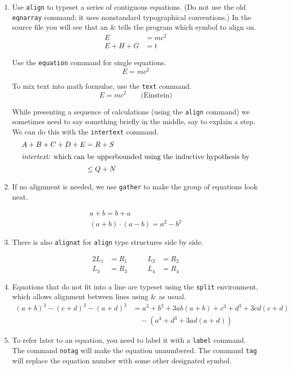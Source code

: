 \begin{enumerate}
\item Use {\tt align} to typeset a series of contiguous equations.
(Do not use the old {\tt eqnarray} command; it uses nonstandard 
typographical conventions.) In the source file you will see that 
an \& tells the program which symbol to align on.
\begin{align}
E & =  mc^2\\
E+ H + G & = t 
\end{align}


Use the  {\tt equation} command for single equations.
\begin{equation}
E  =  mc^2
\end{equation}

To mix text into math formulae, use the {\tt text} command.
\begin{equation}
E  =  mc^2 \qquad \text{(Einstein)}
\end{equation}

While  presenting a sequence of calculations 
(using the {\tt align} command) we sometimes
need to say something briefly in the middle, say to explain a step.
We can do this with
the {\tt intertext} command.
\begin{align}
A+ B+ C + D + E & =  R+ S \\
\intertext{{\em intertext:} which can be upperbounded using the inductive hypothesis by}
& \leq Q + N
\end{align}

\item If no alignment is needed, we use {\tt gather} to make the group of equations look
neat.

\begin{gather}
a+b = b+a \\
(a+b)\cdot (a-b) = a^2 -b^2
\end{gather}

\item There is also {\tt alignat} for {\tt align} type structures side by side.

\begin{alignat}{2}
L_1 & = R_1 & \qquad L_2 & = R_2 \\
L_3 & =  R_3 & \qquad L_4 &= R_4
\end{alignat}

\item Equations that do not fit into a line are typeset using the {\tt split} environment,
which allows alignment between lines using \& as usual.
\begin{equation}
\begin{split}
(a+ b)^3 - (c+d)^3 - (a+ d)^3  & = a^3 + b^3 +3ab(a+b) + c^3 +d^3 +3cd(c+d) \\
& \quad - (a^3 + d^3 +3ad(a+d))
\end{split}
\end{equation}
\item To refer later to an equation, you need to label it with a {\tt label} command.
The command {\tt notag} will make the equation unnumbered. The command {\tt tag} will
replace the equation number with some other designated symbol.


\end{enumerate}
